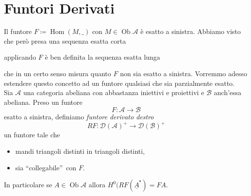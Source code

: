 \documentclass[a4paper,11pt,oneside]{book}
\newcommand{\A}{\mathcal{A}}
\newcommand{\B}{\mathcal{B}}
\newcommand{\der}[1]{\mathcal{D}(#1)}
\newcommand{\complx}[1]{#1^{^\bullet}}
\DeclareMathOperator{\Ob}{Ob}
\DeclareMathOperator{\Hom}{Hom}
\DeclareMathOperator{\Ext}{Ext}
\theoremstyle{definition}
\begin{document}
 \section{Funtori Derivati}
 Il funtore $F\coloneqq\Hom(M,\_)$ con  $M\in \Ob \A$ è esatto a sinistra. Abbiamo visto che però presa
 una sequenza esatta corta
 \begin{center}
      \end{center} 
      applicando $F$ è ben definita la sequenza esatta lunga
          \begin{center} 	
    \end{center} 
  che in un certo senso misura quanto $F$ non sia esatto a sinistra. Vorremmo adesso estendere questo concetto ad un 
  funtore qualsiasi che sia parzialmente esatto.\\
  
   Sia $\A$ una categoria abeliana con abbastanza iniettivi e proiettivi e $\B$ anch'essa abeliana. Preso un funtore 
   \[
    F\colon \A\longrightarrow \B
   \]
   esatto a sinistra, definiamo \emph{funtore derivato destro}
   \[
    RF\colon \der\A^+\longrightarrow \der\B^+
   \]
   un funtore tale che
   \begin{itemize}
    \item mandi triangoli distinti in triangoli distinti,
    \item sia \textquotedblleft collegabile\textquotedblright \ con $F$.
   \end{itemize}
   In particolare se $A\in\Ob\A$ allora $H^0(RF(\complx{\underline A})=FA$.\\
\end{document}
